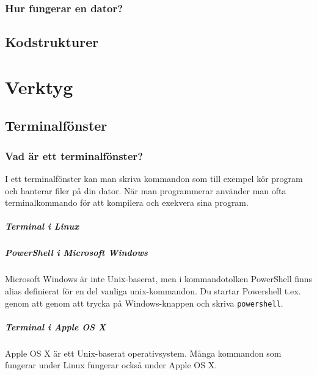 \documentclass[a4paper]{compendium}
\begin{document}
\lipsum
\lipsum

\section{Hur fungerar en dator?}

\lipsum

\lipsum

\chapter{Kodstrukturer}
\lipsum

\part{Verktyg}



\chapter{Terminalfönster}

\section{Vad är ett terminalfönster?}

I ett terminalfönster kan man skriva kommandon som till exempel kör program och hanterar filer på din dator. När man programmerar använder man ofta terminalkommando för att kompilera och exekvera sina program.   
 
\subsubsection{Terminal i Linux}

\subsubsection{PowerShell i Microsoft Windows}
Microsoft Windows är inte Unix-baserat, men i kommandotolken PowerShell finns alias definierat för en del vanliga unix-kommandon. Du startar Powershell t.ex. genom att genom att trycka på Windows-knappen och skriva \texttt{powershell}.

\subsubsection{Terminal i Apple OS X}
Apple OS X är ett Unix-baserat operativsystem. Många kommandon som fungerar under Linux fungerar också under Apple OS X.
\end{document}
